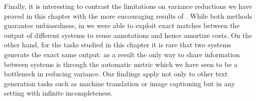 Finally, it is interesting to contrast the limitations on variance reductions we have proved in this chapter with the more encouraging results of .
While both methods guarantee unbiasedness, in  we were able to exploit exact matches between the output of different systems to reuse annotations and hence amortize costs.
On the other hand, for the tasks studied in this chapter it is rare that two systems generate the exact same output: as a result the only way to share information between systems is through the automatic metric which we have seen to be a bottleneck in reducing variance.
Our findings apply not only to other text generation tasks such as machine translation or image captioning but in any setting with infinite incompleteness.
